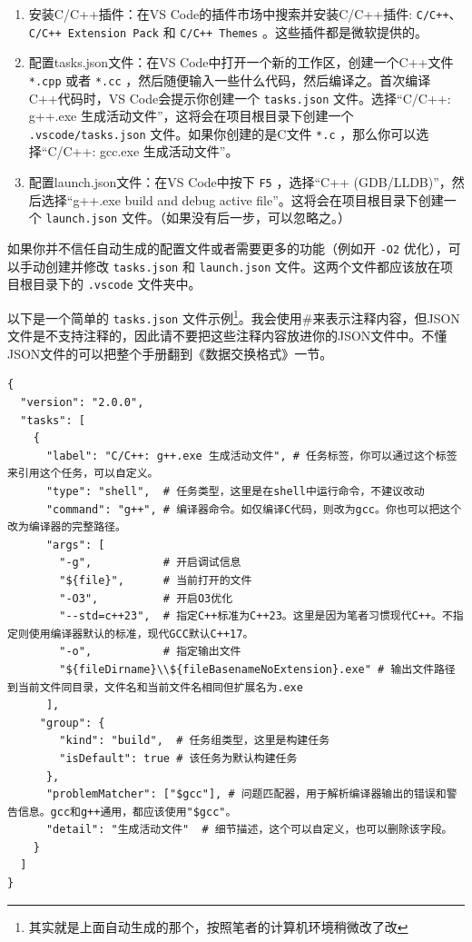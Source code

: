 \begin{enumerate}
  \item 安装C/C++插件：在VS Code的插件市场中搜索并安装C/C++插件: \texttt{C/C++}、\texttt{C/C++ Extension Pack} 和 \texttt{C/C++ Themes} 。这些插件都是微软提供的。
  \item 配置tasks.json文件：在VS Code中打开一个新的工作区，创建一个C++文件 \texttt{*.cpp} 或者 \texttt{*.cc} ，然后随便输入一些什么代码，然后编译之。首次编译C++代码时，VS Code会提示你创建一个 \texttt{tasks.json} 文件。选择“C/C++: g++.exe 生成活动文件”，这将会在项目根目录下创建一个 \texttt{.vscode/tasks.json} 文件。如果你创建的是C文件 \texttt{*.c} ，那么你可以选择“C/C++: gcc.exe 生成活动文件”。
  \item 配置launch.json文件：在VS Code中按下 \texttt{F5} ，选择“C++ (GDB/LLDB)”，然后选择“g++.exe build and debug active file”。这将会在项目根目录下创建一个 \texttt{launch.json} 文件。（如果没有后一步，可以忽略之。）
\end{enumerate}

如果你并不信任自动生成的配置文件或者需要更多的功能（例如开 \texttt{-O2} 优化），可以手动创建并修改 \texttt{tasks.json} 和 \texttt{launch.json} 文件。这两个文件都应该放在项目根目录下的 \texttt{.vscode} 文件夹中。

以下是一个简单的 \texttt{tasks.json} 文件示例\footnote{其实就是上面自动生成的那个，按照笔者的计算机环境稍微改了改}。我会使用\#来表示注释内容，但JSON文件是不支持注释的，因此请不要把这些注释内容放进你的JSON文件中。不懂JSON文件的可以把整个手册翻到《数据交换格式》一节。

\begin{verbatim}
{
  "version": "2.0.0", 
  "tasks": [
    {
      "label": "C/C++: g++.exe 生成活动文件", # 任务标签，你可以通过这个标签来引用这个任务，可以自定义。
      "type": "shell",  # 任务类型，这里是在shell中运行命令，不建议改动
      "command": "g++", # 编译器命令。如仅编译C代码，则改为gcc。你也可以把这个改为编译器的完整路径。
      "args": [
        "-g",           # 开启调试信息
        "${file}",      # 当前打开的文件
        "-O3",          # 开启O3优化
        "--std=c++23",  # 指定C++标准为C++23。这里是因为笔者习惯现代C++。不指定则使用编译器默认的标准，现代GCC默认C++17。
        "-o",           # 指定输出文件
        "${fileDirname}\\${fileBasenameNoExtension}.exe" # 输出文件路径到当前文件同目录，文件名和当前文件名相同但扩展名为.exe
      ],
     "group": {
        "kind": "build",  # 任务组类型，这里是构建任务
        "isDefault": true # 该任务为默认构建任务
      },
      "problemMatcher": ["$gcc"], # 问题匹配器，用于解析编译器输出的错误和警告信息。gcc和g++通用，都应该使用"$gcc"。
      "detail": "生成活动文件"  # 细节描述，这个可以自定义，也可以删除该字段。
    }
  ]
}
\end{verbatim}

